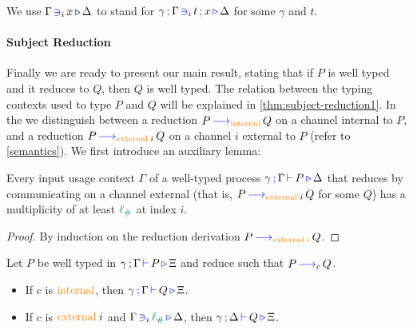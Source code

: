  We use $\containsusage{\Gamma}{i}{x}{\Delta}$ to stand for $\contains{\gamma}{\Gamma}{i}{t}{x}{\Delta}$ for some $\gamma$ and $t$.

\paragraph*{Subject Reduction}
Finally we are ready to present our main result, stating  that if $P$ is well typed and it reduces to $Q$, then $Q$ is well typed.
The relation between the typing contexts used to type $P$ and $Q$ will be explained in \autoref{thm:subject-reduction1}.
In the \picalc{} we distinguish between a reduction $P \reduce{\constr{internal}} Q$ on a channel internal to $P$, and a reduction $P \reduce{\constr{external} \; i} Q$ on a channel $i$ external to $P$ (refer to \autoref{semantics}).
We first introduce an auxiliary lemma:

\begin{nilemma}
  \label{lm:comm-capable}
  Every input usage context $\Gamma$ of a well-typed process $\types{\gamma}{\Gamma}{P}{\Delta}$ that reduces by communicating on a channel external (that is, $P \reduce{\constr{external} \; i} Q$ for some $Q$) has a multiplicity of at least $\lio$ at index $i$.
\end{nilemma}

\begin{proof}
  By induction on the reduction derivation $P \reduce{\constr{external \; i}}Q$.
\end{proof}

\begin{nitheorem}
  \label{thm:subject-reduction1}
  Let $P$ be well typed in $\types{\gamma}{\Gamma}{P}{\Xi}$ and reduce such that $P \reduce{c} Q$.
  \begin{itemize}
    \item If $c$ is $\constr{internal}$, then $\types{\gamma}{\Gamma}{Q}{\Xi}$.
    \item If $c$ is $\constr{external} \; i$ and $\containsusage{\Gamma}{i}{\lio}{\Delta}$, then $\types{\gamma}{\Delta}{Q}{\Xi}$.
  \end{itemize}
\end{nitheorem}

